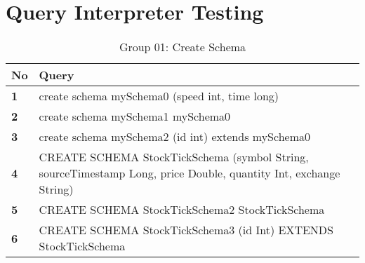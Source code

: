 \chapter{Query Interpreter Testing} 


\begin{table}[h]
\caption{Group 01: Create Schema}
\centering
\label{table:createSchemaTest}
\setlength\extrarowheight{5pt}
\begin{tabular}{||>{\centering\bfseries}m{0.5in}|>{\centering\arraybackslash}m{5in}||}
\hline
\textbf{No} & \textbf{Query} \\ \hline\hline
     1  &  create schema mySchema0 (speed int, time long) \\ \hline
      2  &  create schema mySchema1 mySchema0 \\ \hline
      3  &  create schema mySchema2 (id int) extends mySchema0 \\ \hline
      4  &  CREATE SCHEMA StockTickSchema (symbol String, sourceTimestamp Long, price Double, quantity Int, exchange String) \\ \hline
      5  &  CREATE SCHEMA StockTickSchema2 StockTickSchema \\ \hline
       6 &  CREATE SCHEMA StockTickSchema3 (id Int) EXTENDS StockTickSchema \\ \hline					           				
 \end{tabular}
\end{table}


